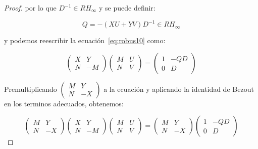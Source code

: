 \begin{proof}
            por lo que $D^{-1} \in RH_{\infty}$ y se puede definir:

            \begin{equation}
                Q = - (XU + YV) D^{-1} \in RH_{\infty}
            \end{equation}

            y podemos reescribir la ecuación~\ref{eq:robus10} como:

            \begin{equation} \label{eq:robus11}
                \begin{pmatrix}
                    X & Y \\
                    N & -M
                \end{pmatrix}
                \begin{pmatrix}
                    M & U \\
                    N & V
                \end{pmatrix} =
                \begin{pmatrix}
                    1 & -QD \\
                    0 & D
                \end{pmatrix}
            \end{equation}

            Premultiplicando $\begin{pmatrix} M & Y \\ N & -X \end{pmatrix}$ a la ecuación\label{eq:robus11} y aplicando la identidad de Bezout en los terminos adecuados, obtenemos:

            \begin{equation*}
                \begin{pmatrix}
                    M & Y \\
                    N & -X
                \end{pmatrix}
                \begin{pmatrix}
                    X & Y \\
                    N & -M
                \end{pmatrix}
                \begin{pmatrix}
                    M & U \\
                    N & V
                \end{pmatrix} =
                \begin{pmatrix}
                    M & Y \\
                    N & -X
                \end{pmatrix}
                \begin{pmatrix}
                    1 & -QD \\
                    0 & D
                \end{pmatrix}
            \end{equation*}


\end{proof}
